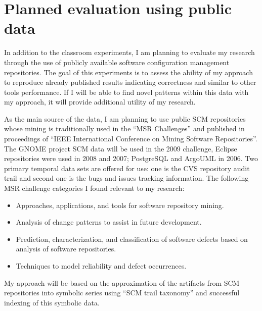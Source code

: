 \section{Planned evaluation using public data}\label{public.evaluation}
In addition to the classroom experiments, I am planning to evaluate my research through the use of publicly available software configuration management repositories. The goal of this experiments is to assess the ability of my approach to reproduce already published results indicating correctness and similar to other tools performance. If I will be able to find novel patterns within this data with my approach, it will provide additional utility of my research.

As the main source of the data, I am planning to use public SCM repositories whose mining is traditionally used in the ``MSR Challenges'' \cite{citeulike:5043676} and published in proceedings of ``IEEE International Conference on Mining Software Repositories''. The GNOME project SCM data will be used in the 2009 challenge, Eclipse repositories were used in 2008 and 2007; PostgreSQL and ArgoUML in 2006. Two primary temporal data sets are offered for use: one is the CVS repository audit trail and second one is the bugs and issues tracking information. The following MSR challenge categories I found relevant to my research:
\begin{itemize}
  \item Approaches, applications, and tools for software repository mining.
  \item Analysis of change patterns to assist in future development.
	\item Prediction, characterization, and classification of software defects based on analysis of software repositories.
	\item Techniques to model reliability and defect occurrences.
\end{itemize}
My approach will be based on the approximation of the artifacts from SCM repositories into symbolic series using ``SCM trail taxonomy'' and successful indexing of this symbolic data. 

